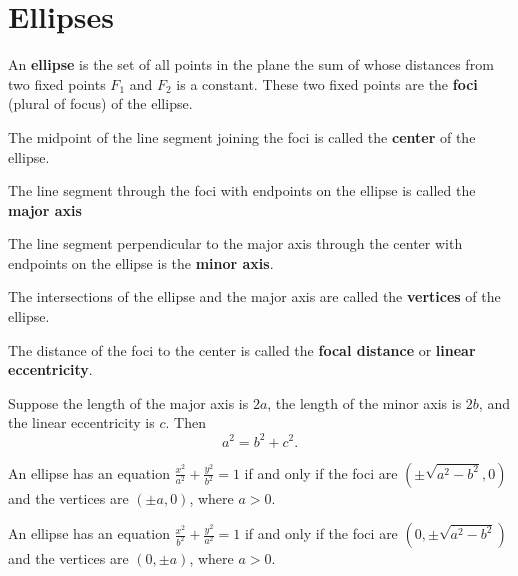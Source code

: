 \section{Ellipses}

\begin{definition}
An \textbf{ellipse} is the set of all points in the plane the sum of whose distances from two fixed points $F_1$ and $F_2$ is a constant. These two fixed points are the \textbf{foci} (plural of focus) of the ellipse.
\end{definition}

\begin{definition}
The midpoint of the line segment joining the foci is called the \textbf{center} of the ellipse.

The line segment through the foci with endpoints on the ellipse is called the \textbf{major axis}

The line segment perpendicular to the major axis through the center with endpoints on the ellipse is the \textbf{minor axis}.

The intersections of the ellipse and the major axis are called the \textbf{vertices} of the ellipse.

The distance of the foci to the center is called the \textbf{focal distance} or \textbf{linear eccentricity}. 

\end{definition}

\begin{proposition}
    Suppose the length of the major axis is $2a$, the length of the minor axis is $2b$, and the linear eccentricity is $c$. Then
    \[a^2=b^2+c^2.\]
\end{proposition}

\begin{theorem}
An ellipse has an equation $\frac{x^2}{a^2}+\frac{y^2}{b^2}=1$ if and only if the foci are $(\pm \sqrt{a^2-b^2}, 0)$ and the vertices are $(\pm a, 0)$, where $a>0$.
\end{theorem}

\begin{theorem}
An ellipse has an equation $\frac{x^2}{b^2}+\frac{y^2}{a^2}=1$ if and only if the foci are $(0, \pm \sqrt{a^2-b^2})$ and the vertices are $(0, \pm a)$, where $a>0$.
\end{theorem}

